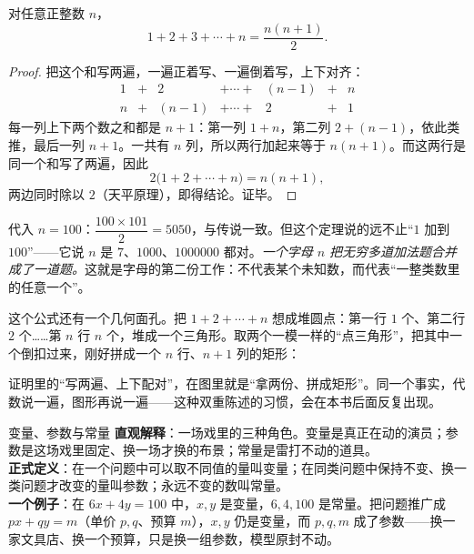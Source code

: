 \begin{dingli}[连续自然数之和]
对任意正整数 $n$，
\[
1+2+3+\cdots+n=\frac{n(n+1)}{2}.
\]
\end{dingli}

\begin{proof}
把这个和写两遍，一遍正着写、一遍倒着写，上下对齐：
\[
\begin{array}{ccccccc}
1 & + & 2 & + \cdots + & (n-1) & + & n\\
n & + & (n-1) & + \cdots + & 2 & + & 1
\end{array}
\]
每一列上下两个数之和都是 $n+1$：第一列 $1+n$，第二列 $2+(n-1)$，依此类推，最后一列 $n+1$。一共有 $n$ 列，所以两行加起来等于 $n(n+1)$。而这两行是同一个和写了两遍，因此
\[
2\bigl(1+2+\cdots+n\bigr)=n(n+1),
\]
两边同时除以 $2$（天平原理），即得结论。证毕。
\end{proof}

代入 $n=100$：$\dfrac{100\times101}{2}=5050$，与传说一致。但这个定理说的远不止“$1$ 加到 $100$”——它说 $n$ 是 $7$、$1000$、$1000000$ 都对。\emph{一个字母 $n$ 把无穷多道加法题合并成了一道题。}这就是字母的第二份工作：不代表某个未知数，而代表“一整类数里的任意一个”。

这个公式还有一个几何面孔。把 $1+2+\cdots+n$ 想成堆圆点：第一行 $1$ 个、第二行 $2$ 个……第 $n$ 行 $n$ 个，堆成一个三角形。取两个一模一样的“点三角形”，把其中一个倒扣过来，刚好拼成一个 $n$ 行、$n+1$ 列的矩形：

\begin{center}
\end{center}

证明里的“写两遍、上下配对”，在图里就是“拿两份、拼成矩形”。同一个事实，代数说一遍，图形再说一遍——这种双重陈述的习惯，会在本书后面反复出现。

\begin{shuyu}{变量、参数与常量}
\textbf{直观解释}：一场戏里的三种角色。变量是真正在动的演员；参数是这场戏里固定、换一场才换的布景；常量是雷打不动的道具。\\
\textbf{正式定义}：在一个问题中可以取不同值的量叫变量；在同类问题中保持不变、换一类问题才改变的量叫参数；永远不变的数叫常量。\\
\textbf{一个例子}：在 $6x+4y=100$ 中，$x,y$ 是变量，$6,4,100$ 是常量。把问题推广成 $px+qy=m$（单价 $p,q$、预算 $m$），$x,y$ 仍是变量，而 $p,q,m$ 成了参数——换一家文具店、换一个预算，只是换一组参数，模型原封不动。
\end{shuyu}

